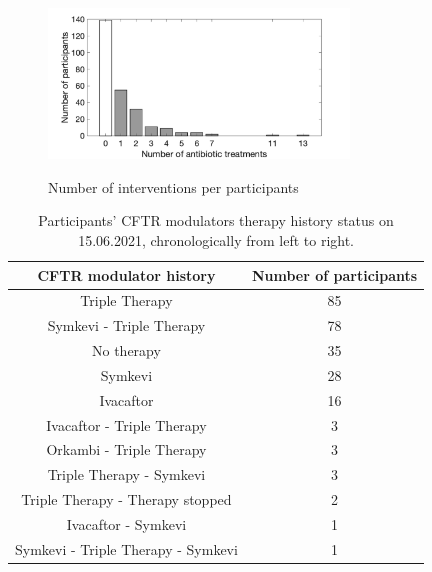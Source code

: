 \begin{appendices}
\begin{figure}[!h]
\begin{minipage}{0.48\textwidth}
    \caption{Number of interventions per participants}
    \centering
    \includegraphics[width=80mm]{images/bar_intrperpatient_before_filter.png}
    \label{fig:nintr}
    
   \end{minipage}
\end{figure}

    
    \begin{table}[]
        \centering
        \begin{tabular}{c|c}
        \hline
             \textbf{CFTR modulator history} & \textbf{Number of participants} \\
             \hline
             Triple Therapy & 85 \\
             Symkevi - Triple Therapy & 78 \\
             No therapy & 35 \\
             Symkevi & 28 \\
             Ivacaftor & 16 \\
             Ivacaftor - Triple Therapy & 3 \\
             Orkambi - Triple Therapy & 3 \\
             Triple Therapy - Symkevi & 3 \\
             Triple Therapy - Therapy stopped & 2 \\
             Ivacaftor - Symkevi & 1 \\
             Symkevi - Triple Therapy - Symkevi & 1 \\
             \hline
        \end{tabular}
        \caption{Participants' CFTR modulators therapy history status on 15.06.2021, chronologically from left to right. }
        \label{tab:cftrmodulators}
    \end{table}

\begin{table}
\begin{tabular}{l|l|l} 

\hline


\end{tabular}
\end{table}
\end{appendices}
